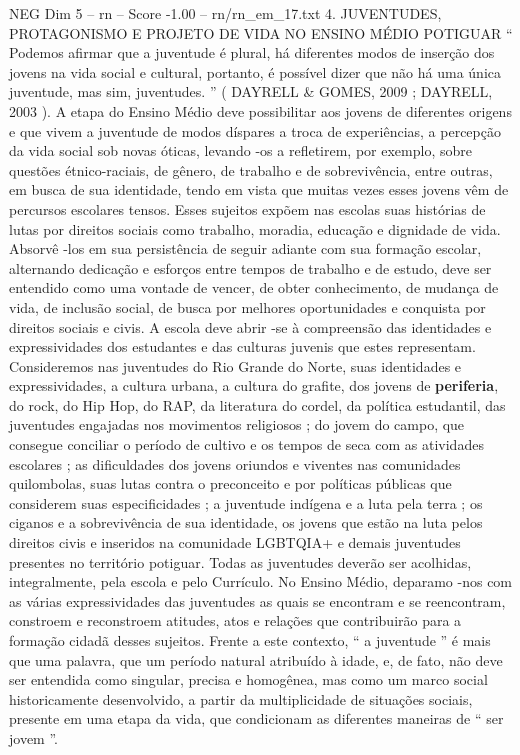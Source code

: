 \begin{textsample}{NEG Dim 5 – rn – Score -1.00 – rn/rn\_em\_17.txt}  \label{ex:f5_neg_148}
4.
JUVENTUDES, PROTAGONISMO E PROJETO DE VIDA NO ENSINO MÉDIO POTIGUAR “ Podemos afirmar que a juventude é plural, há diferentes modos de inserção dos jovens na vida social e cultural, portanto, é possível dizer que não há uma única juventude, mas sim, juventudes. ” ( DAYRELL \& GOMES, 2009 ; DAYRELL, 2003 ).
A etapa do Ensino Médio deve possibilitar aos jovens de diferentes origens e que vivem a juventude de modos díspares a troca de experiências, a percepção da vida social sob novas óticas, levando -os a refletirem, por exemplo, sobre questões étnico-raciais, de gênero, de trabalho e de sobrevivência, entre outras, em busca de sua identidade, tendo em vista que muitas vezes esses jovens vêm de percursos escolares tensos.
Esses sujeitos expõem nas escolas suas histórias de lutas por direitos sociais como trabalho, moradia, educação e dignidade de vida.
Absorvê -los em sua persistência de seguir adiante com sua formação escolar, alternando dedicação e esforços entre tempos de trabalho e de estudo, deve ser entendido como uma vontade de vencer, de obter conhecimento, de mudança de vida, de inclusão social, de busca por melhores oportunidades e conquista por direitos sociais e civis.
A escola deve abrir -se à compreensão das identidades e expressividades dos estudantes e das culturas juvenis que estes representam.
Consideremos nas juventudes do Rio Grande do Norte, suas identidades e expressividades, a cultura urbana, a cultura do grafite, dos jovens de \textbf{periferia}, do rock, do Hip Hop, do RAP, da literatura do cordel, da política estudantil, das juventudes engajadas nos movimentos religiosos ; do jovem do campo, que consegue conciliar o período de cultivo e os tempos de seca com as atividades escolares ; as dificuldades dos jovens oriundos e viventes nas comunidades quilombolas, suas lutas contra o preconceito e por políticas públicas que considerem suas especificidades ; a juventude indígena e a luta pela terra ; os ciganos e a sobrevivência de sua identidade, os jovens que estão na luta pelos direitos civis e inseridos na comunidade LGBTQIA+ e demais juventudes presentes no território potiguar.
Todas as juventudes deverão ser acolhidas, integralmente, pela escola e pelo Currículo.
No Ensino Médio, deparamo -nos com as várias expressividades das juventudes as quais se encontram e se reencontram, constroem e reconstroem atitudes, atos e relações que contribuirão para a formação cidadã desses sujeitos.
Frente a este contexto, “ a juventude ” é mais que uma palavra, que um período natural atribuído à idade, e, de fato, não deve ser entendida como singular, precisa e homogênea, mas como um marco social historicamente desenvolvido, a partir da multiplicidade de situações sociais, presente em uma etapa da vida, que condicionam as diferentes maneiras de “ ser jovem ”.

\end{textsample}
